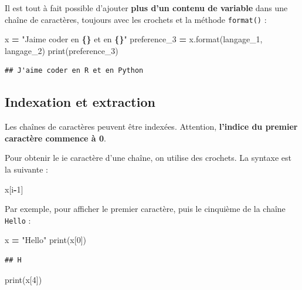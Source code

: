 \documentclass[
  12pt,
]{book}
\newenvironment{Shaded}{\begin{snugshade}}{\end{snugshade}}
\newcommand{\BuiltInTok}[1]{#1}
\newcommand{\DecValTok}[1]{\textcolor[rgb]{0.00,0.00,0.81}{#1}}
\newcommand{\NormalTok}[1]{#1}
\newcommand{\OperatorTok}[1]{\textcolor[rgb]{0.81,0.36,0.00}{\textbf{#1}}}
\newcommand{\SpecialCharTok}[1]{\textcolor[rgb]{0.81,0.36,0.00}{\textbf{#1}}}
\newcommand{\StringTok}[1]{\textcolor[rgb]{0.31,0.60,0.02}{#1}}
\numberwithin{equation}{section}
\numberwithin{countremarque}{section}
\begin{document}
Il est tout à fait possible d'ajouter \textbf{plus d'un contenu de variable} dans une chaîne de caractères, toujours avec les crochets et la méthode \texttt{format()} :

\begin{Shaded}
\begin{Highlighting}[]
\NormalTok{x }\OperatorTok{=} \StringTok{"J\textquotesingle{}aime coder en }\SpecialCharTok{\{\}}\StringTok{ et en }\SpecialCharTok{\{\}}\StringTok{"}
\NormalTok{preference\_3 }\OperatorTok{=}\NormalTok{ x.}\BuiltInTok{format}\NormalTok{(langage\_1, langage\_2)}
\BuiltInTok{print}\NormalTok{(preference\_3)}
\end{Highlighting}
\end{Shaded}

\begin{lstlisting}
## J'aime coder en R et en Python
\end{lstlisting}

\subsection{Indexation et extraction}\label{indexation-et-extraction}

Les chaînes de caractères peuvent être indexées. Attention, \textbf{l'indice du premier caractère commence à 0}.

Pour obtenir le ie caractère d'une chaîne, on utilise des crochets. La syntaxe est la suivante :

\begin{Shaded}
\begin{Highlighting}[]
\NormalTok{x[i}\OperatorTok{{-}}\DecValTok{1}\NormalTok{]}
\end{Highlighting}
\end{Shaded}

Par exemple, pour afficher le premier caractère, puis le cinquième de la chaîne \texttt{Hello} :

\begin{Shaded}
\begin{Highlighting}[]
\NormalTok{x }\OperatorTok{=} \StringTok{"Hello"}
\BuiltInTok{print}\NormalTok{(x[}\DecValTok{0}\NormalTok{])}
\end{Highlighting}
\end{Shaded}

\begin{lstlisting}
## H
\end{lstlisting}

\begin{Shaded}
\begin{Highlighting}[]
\BuiltInTok{print}\NormalTok{(x[}\DecValTok{4}\NormalTok{])}
\end{Highlighting}
\end{Shaded}
\end{document}
